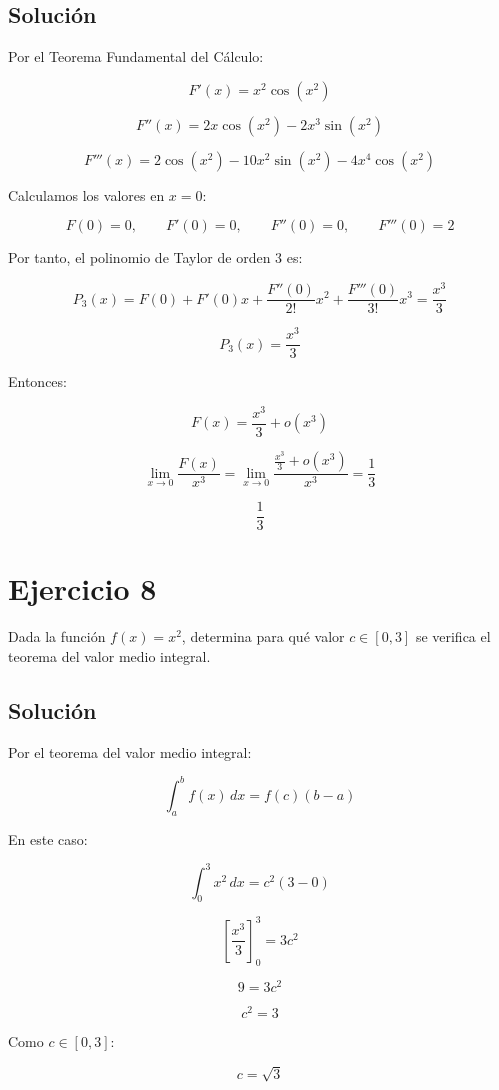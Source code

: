 \documentclass[fleqn]{article}
\begin{document}
	\subsection{Solución}

	Por el Teorema Fundamental del Cálculo:

	\[
	F'(x)=x^2\cos(x^2)
	\]

	\[
	F''(x)
	=
	2x\cos(x^2)-2x^3\sin(x^2)
	\]

	\[
	F'''(x)
	=
	2\cos(x^2)
	-10x^2\sin(x^2)
	-4x^4\cos(x^2)
	\]

	Calculamos los valores en $x=0$:

	\[
	F(0)=0,
	\qquad
	F'(0)=0,
	\qquad
	F''(0)=0,
	\qquad
	F'''(0)=2
	\]

	Por tanto, el polinomio de Taylor de orden 3 es:

	\[
	P_3(x)
	=
	F(0)+F'(0)x+\frac{F''(0)}{2!}x^2
	+\frac{F'''(0)}{3!}x^3
	=
	\frac{x^3}{3}
	\]

	\[
	\boxed{P_3(x)=\frac{x^3}{3}}
	\]

	Entonces:

	\[
	F(x)
	=
	\frac{x^3}{3}+o(x^3)
	\]

	\[
	\lim_{x\to0}\frac{F(x)}{x^3}
	=
	\lim_{x\to0}
	\frac{\frac{x^3}{3}+o(x^3)}{x^3}
	=
	\frac{1}{3}
	\]

	\[
	\boxed{\frac{1}{3}}
	\]

\section{Ejercicio 8}
	Dada la función $f(x)=x^2$, determina para qué valor
	$c\in[0,3]$ se verifica el teorema del valor medio integral.

	\subsection{Solución}

	Por el teorema del valor medio integral:

	\[
	\int_a^b f(x)\,dx
	=
	f(c)(b-a)
	\]

	En este caso:

	\[
	\int_0^3 x^2\,dx
	=
	c^2(3-0)
	\]

	\[
	\left[\frac{x^3}{3}\right]_0^3
	=
	3c^2
	\]

	\[
	9=3c^2
	\]

	\[
	c^2=3
	\]

	Como $c\in[0,3]$:

	\[
	\boxed{c=\sqrt{3}}
	\]
\end{document}
